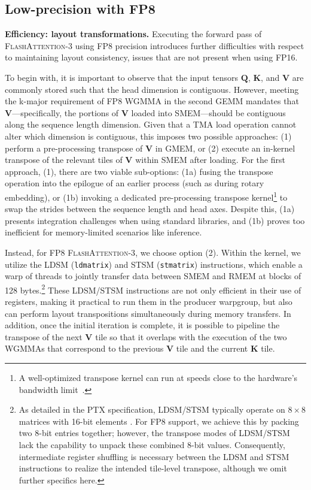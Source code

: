 \subsection{Low-precision with FP8}
\label{sec:algofp8}

\textbf{Efficiency: layout transformations.} Executing the forward pass of \textsc{FlashAttention-3} using FP8 precision introduces further difficulties with respect to maintaining layout consistency, issues that are not present when using FP16.

To begin with, it is important to observe that the input tensors $\mathbf{Q}$, $\mathbf{K}$, and $\mathbf{V}$ are commonly stored such that the head dimension is contiguous. However, meeting the k-major requirement of FP8 WGMMA in the second GEMM mandates that $\mathbf{V}$—specifically, the portions of $\mathbf{V}$ loaded into SMEM—should be contiguous along the sequence length dimension. Given that a TMA load operation cannot alter which dimension is contiguous, this imposes two possible approaches: (1) perform a pre-processing transpose of $\mathbf{V}$ in GMEM, or (2) execute an in-kernel transpose of the relevant tiles of $\mathbf{V}$ within SMEM after loading. For the first approach, (1), there are two viable sub-options: (1a) fusing the transpose operation into the epilogue of an earlier process (such as during rotary embedding), or (1b) invoking a dedicated pre-processing transpose kernel\footnote{A well-optimized transpose kernel can run at speeds close to the hardware's bandwidth limit~\citep{colfax_cutlass_transpose_2024}.} to swap the strides between the sequence length and head axes. Despite this, (1a) presents integration challenges when using standard libraries, and (1b) proves too inefficient for memory-limited scenarios like inference.

Instead, for FP8 \textsc{FlashAttention-3}, we choose option (2). Within the kernel, we utilize the LDSM (\verb|ldmatrix|) and STSM (\verb|stmatrix|) instructions, which enable a warp of threads to jointly transfer data between SMEM and RMEM at blocks of 128 bytes.\footnote{As detailed in the PTX specification, LDSM/STSM typically operate on $8 \times 8$ matrices with 16-bit elements \cite[\S 9.7.13.4.15-16]{ptx}. For FP8 support, we achieve this by packing two 8-bit entries together; however, the transpose modes of LDSM/STSM lack the capability to unpack these combined 8-bit values. Consequently, intermediate register shuffling is necessary between the LDSM and STSM instructions to realize the intended tile-level transpose, although we omit further specifics here.} These LDSM/STSM instructions are not only efficient in their use of registers, making it practical to run them in the producer warpgroup, but also can perform layout transpositions simultaneously during memory transfers. In addition, once the initial iteration is complete, it is possible to pipeline the transpose of the next $\mathbf{V}$ tile so that it overlaps with the execution of the two WGMMAs that correspond to the previous $\mathbf{V}$ tile and the current $\mathbf{K}$ tile.

